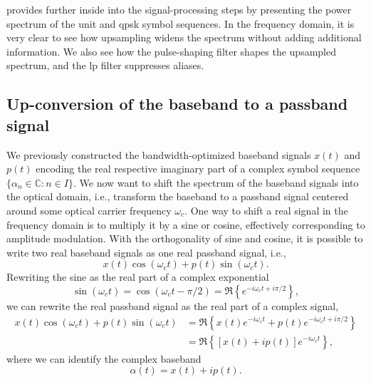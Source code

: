  provides further inside into the signal-processing steps by presenting the power spectrum of the unit and \gls{qpsk} symbol sequences.
In the frequency domain, it is very clear to see how upsampling widens the spectrum without adding additional information.
We also see how the pulse-shaping filter shapes the upsampled spectrum, and the \gls{lp} filter suppresses aliases.

\FloatBarrier
\subsection{Up-conversion of the baseband to a passband signal}

We previously constructed the bandwidth-optimized baseband signals $x(t)$ and $p(t)$ encoding the real respective imaginary part of a complex symbol sequence $\{\alpha_n\in\mathbb{C}\colon n\in I\}$.
We now want to shift the spectrum of the baseband signals into the optical domain, i.e., transform the baseband to a passband signal centered around some optical carrier frequency $\omega_c$.
One way to shift a real signal in the frequency domain is to multiply it by a sine or cosine, effectively corresponding to amplitude modulation.
With the orthogonality of sine and cosine, it is possible to write two real baseband signals as one real passband signal, i.e.,
\begin{equation}
	x(t)
	\cos(\omega_ct)
	+
	p(t)
	\sin(\omega_ct)
	.
\end{equation}
Rewriting the sine as the real part of a complex exponential
\begin{equation}
	\sin(\omega_ct)
	=
	\cos(\omega_c t-\pi/2)
	=
	\Re\left\{e^{-i\omega_c t+i\pi/2}\right\}
	,
\end{equation}
we can rewrite the real passband signal as the real part of a complex signal,
\begin{equation}
	\begin{split}
		x(t)
		\cos(\omega_ct)
		+
		p(t)
		\sin(\omega_ct)
		&=
		\Re\left\{
			x(t)
			e^{-i\omega_ct}
			+
			p(t)
			e^{-i\omega_ct+i\pi/2}
		\right\}
		\\
		&=
		\Re\left\{
			\left[
				x(t)
				+
				ip(t)
			\right]
			e^{-i\omega_ct}
		\right\}
		,
	\end{split}
	\label{eq:real_complex_passband}
\end{equation}
where we can identify the complex baseband
\begin{equation}
	\alpha(t)
	=
	x(t)
	+
	ip(t)
	.
\end{equation}
